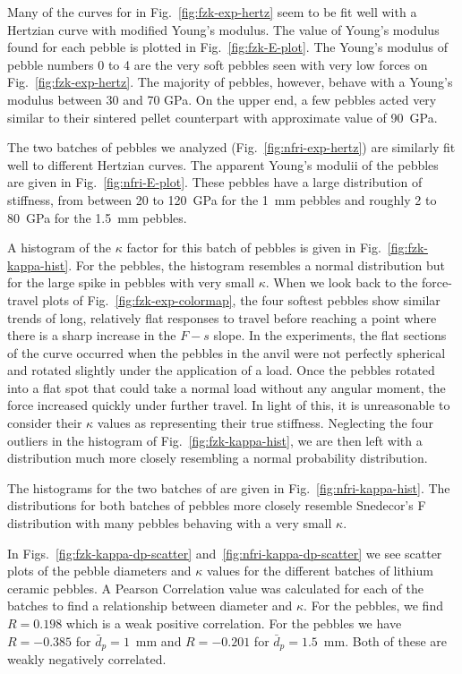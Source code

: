 Many of the curves for \lis in Fig.~\ref{fig:fzk-exp-hertz} seem to be fit well with a Hertzian curve with modified Young's modulus. The value of Young's modulus found for each pebble is plotted in Fig.~\ref{fig:fzk-E-plot}. The Young's modulus of pebble numbers 0 to 4 are the very soft pebbles seen with very low forces on Fig.~\ref{fig:fzk-exp-hertz}. The majority of pebbles, however, behave with a Young's modulus between 30 and 70 \si{GPa}. On the upper end, a few pebbles acted very similar to their sintered pellet counterpart with approximate value of \si{90 GPa}. 

The two batches of \lit pebbles we analyzed (Fig.~\ref{fig:nfri-exp-hertz}) are similarly fit well to different Hertzian curves. The apparent Young's modulii of the \lit pebbles are given in Fig.~\ref{fig:nfri-E-plot}. These \lit pebbles have a large distribution of stiffness, from between 20 to 120~GPa for the 1~mm pebbles and roughly 2 to 80~GPa for the 1.5~mm pebbles.


A histogram of the $\kappa$ factor for this batch of \lis pebbles is given in Fig.~\ref{fig:fzk-kappa-hist}. For the \lis pebbles, the histogram resembles a normal distribution but for the large spike in pebbles with very small $\kappa$. When we look back to the force-travel plots of Fig.~\ref{fig:fzk-exp-colormap}, the four softest pebbles show similar trends of long, relatively flat responses to travel before reaching a point where there is a sharp increase in the $F-s$ slope. In the experiments, the flat sections of the curve occurred when the pebbles in the anvil were not perfectly spherical and rotated slightly under the application of a load. Once the pebbles rotated into a flat spot that could take a normal load without any angular moment, the force increased quickly under further travel. In light of this, it is unreasonable to consider their $\kappa$ values as representing their true stiffness. Neglecting the four outliers in the histogram of Fig.~\ref{fig:fzk-kappa-hist}, we are then left with a distribution much more closely resembling a normal probability distribution.

The histograms for the two batches of \lit are given in Fig.~\ref{fig:nfri-kappa-hist}. The distributions for both batches of \lit pebbles more closely resemble Snedecor's F distribution with many pebbles behaving with a very small $\kappa$.

In Figs.~\ref{fig:fzk-kappa-dp-scatter} and~\ref{fig:nfri-kappa-dp-scatter} we see scatter plots of the pebble diameters and $\kappa$ values for the different batches of lithium ceramic pebbles. A Pearson Correlation value was calculated for each of the batches to find a relationship between diameter and $\kappa$. For the \lis pebbles, we find $R = 0.198$ which is a weak positive correlation. For the \lit pebbles we have $R = -0.385$ for $\bar{d}_p = 1$~mm and $R = -0.201$ for $\bar{d}_p = 1.5$~mm. Both of these are weakly negatively correlated. 

